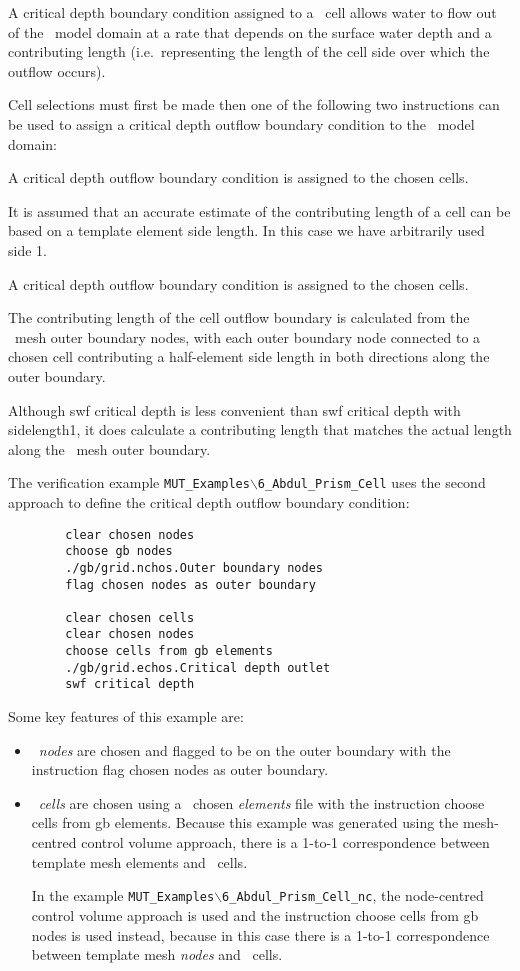 A critical depth boundary condition assigned to a \swf\ cell allows water to flow out of the \swf\ model domain at a rate that depends on the surface water depth and a contributing length (i.e.\ representing the length of the cell side over which the outflow occurs).

Cell selections must first be made then one of the following two  instructions can be used to assign a critical depth outflow boundary condition to the \swf\ model domain:

    {
          A critical depth outflow boundary condition is assigned to the chosen cells.

          It is assumed that an accurate estimate of the contributing length of a cell can be based on a template element side length. In this case we have arbitrarily used side 1.
    }


    {
          A critical depth outflow boundary condition is assigned to the chosen cells.

          The contributing length of the cell outflow boundary is calculated from the \swf\ mesh outer boundary nodes, with each outer boundary node connected to a chosen cell contributing a half-element side length in both directions along the outer boundary.
    }

Although \textsf{swf critical depth} is less convenient than \textsf{swf critical depth with sidelength1}, it does calculate a contributing length that matches the actual length along the \swf\ mesh outer boundary.

The verification example \texttt{MUT\_Examples$\backslash$6\_Abdul\_Prism\_Cell} uses the second approach to define the critical depth outflow boundary condition:
\begin{verbatim}
        clear chosen nodes
        choose gb nodes
        ./gb/grid.nchos.Outer boundary nodes
        flag chosen nodes as outer boundary

        clear chosen cells
        clear chosen nodes
        choose cells from gb elements
        ./gb/grid.echos.Critical depth outlet
        swf critical depth
\end{verbatim}

Some key features of this example are:
\begin{itemize}
    \item \swf\ {\em nodes} are chosen and flagged to be on the outer boundary with the instruction \textsf{flag chosen nodes as outer boundary}.
    \item \swf\ {\em cells} are chosen using a \gb\ chosen {\em elements} file with the instruction \textsf{choose cells from gb elements}.  Because this example was generated using the mesh-centred control volume approach, there is a 1-to-1 correspondence between template mesh elements and \swf\ cells.

        In the example \texttt{MUT\_Examples$\backslash$6\_Abdul\_Prism\_Cell\_nc}, the node-centred control volume approach is used and the instruction \textsf{choose cells from gb nodes} is used instead, because in this case there is a 1-to-1 correspondence between template mesh {\em nodes} and \swf\ cells.
\end{itemize}

